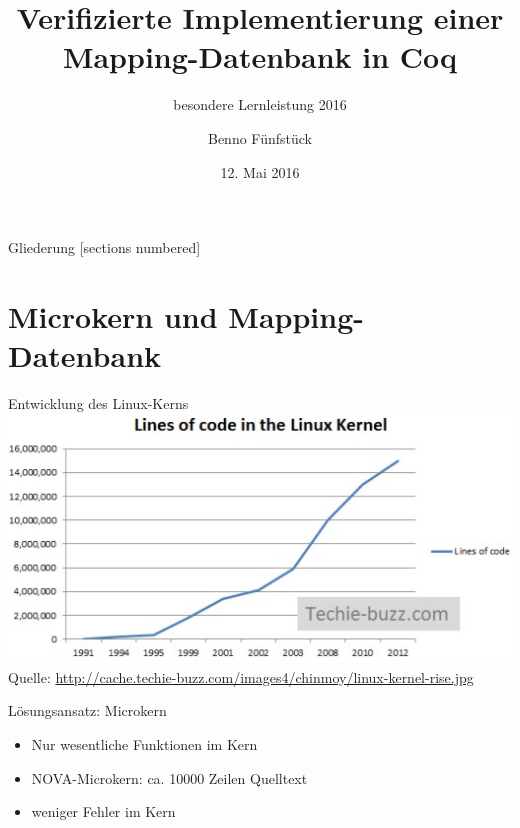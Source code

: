 \documentclass{beamer}
\begin{document}
\title{Verifizierte Implementierung einer Mapping-Datenbank in Coq}
\subtitle{besondere Lernleistung 2016}
\author{Benno Fünfstück}
\date{12. Mai 2016}

\maketitle

\begin{frame}{Gliederung}
  [sections numbered]
  \tableofcontents
\end{frame}

\section{Microkern und Mapping-Datenbank}

\begin{frame}{Entwicklung des Linux-Kerns}
  \centering
  \includegraphics[width=\textwidth]{img/linux-loc2.jpg}\\
  \vfill
  \scriptsize{Quelle:} \url{http://cache.techie-buzz.com/images4/chinmoy/linux-kernel-rise.jpg}
\end{frame}

\begin{frame}{Lösungsansatz: Microkern}
  \begin{itemize}
    \item Nur wesentliche Funktionen im Kern
    \item NOVA-Microkern: ca. 10000 Zeilen Quelltext
    \item weniger Fehler im Kern
  \end{itemize}
\end{frame}
\end{document}
